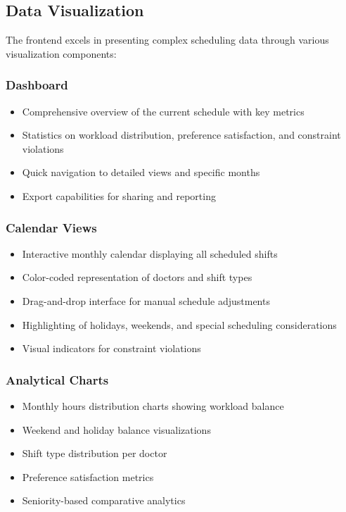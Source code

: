 \documentclass[12pt]{article}
\begin{document}
\subsection{Data Visualization}

The frontend excels in presenting complex scheduling data through various visualization components:

\subsubsection{Dashboard}
\begin{itemize}
    \item Comprehensive overview of the current schedule with key metrics
    \item Statistics on workload distribution, preference satisfaction, and constraint violations
    \item Quick navigation to detailed views and specific months
    \item Export capabilities for sharing and reporting
\end{itemize}

\subsubsection{Calendar Views}
\begin{itemize}
    \item Interactive monthly calendar displaying all scheduled shifts
    \item Color-coded representation of doctors and shift types
    \item Drag-and-drop interface for manual schedule adjustments
    \item Highlighting of holidays, weekends, and special scheduling considerations
    \item Visual indicators for constraint violations
\end{itemize}

\subsubsection{Analytical Charts}
\begin{itemize}
    \item Monthly hours distribution charts showing workload balance
    \item Weekend and holiday balance visualizations
    \item Shift type distribution per doctor
    \item Preference satisfaction metrics
    \item Seniority-based comparative analytics
\end{itemize}
\end{document}
